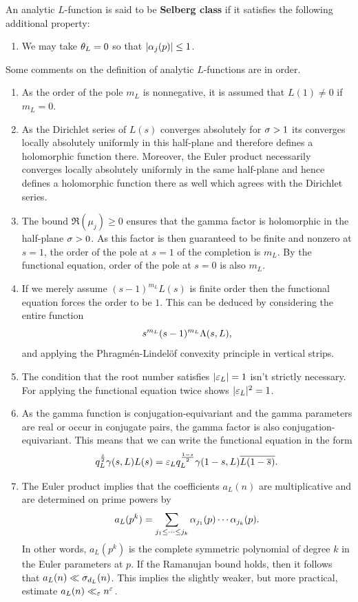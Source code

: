     An analytic \(L\)-function is said to be \textbf{Selberg class} if it satisfies the following additional property:

    \begin{enumerate}[align=left]
      \item[\textbf{Ramanujan bound:}] We may take \(\theta_{L} = 0\) so that \(|\alpha_{j}(p)| \le 1\).
    \end{enumerate}

    Some comments on the definition of analytic \(L\)-functions are in order.
    \begin{enumerate}[label*=(\roman*)]
      \item As the order of the pole \(m_{L}\) is nonnegative, it is assumed that \(L(1) \neq 0\) if \(m_{L} = 0\).
      \item As the Dirichlet series of \(L(s)\) converges absolutely for \(\sigma > 1\) its converges locally absolutely uniformly in this half-plane and therefore defines a holomorphic function there. Moreover, the Euler product necessarily converges locally absolutely uniformly in the same half-plane and hence defines a holomorphic function there as well which agrees with the Dirichlet series.
      \item The bound \(\Re(\mu_{j}) \ge 0\) ensures that the gamma factor is holomorphic in the half-plane \(\sigma > 0\). As this factor is then guaranteed to be finite and nonzero at \(s = 1\), the order of the pole at \(s = 1\) of the completion is \(m_{L}\). By the functional equation, order of the pole at \(s = 0\) is also \(m_{L}\).
      \item If we merely assume \((s-1)^{m_{L}}L(s)\) is finite order then the functional equation forces the order to be \(1\). This can be deduced by considering the entire function
      \[
        s^{m_{L}}(s-1)^{m_{L}}\Lambda(s,L),
      \]
      and applying the Phragm\'en-Lindel\"of convexity principle in vertical strips.
      \item The condition that the root number satisfies \(|\varepsilon_{L}| = 1\) isn't strictly necessary. For applying the functional equation twice shows \(|\varepsilon_{L}|^{2} = 1\).
      \item As the gamma function is conjugation-equivariant and the gamma parameters are real or occur in conjugate pairs, the gamma factor is also conjugation-equivariant. This means that we can write the functional equation in the form
      \[
        q_{L}^{\frac{s}{2}}\gamma(s,L)L(s) = \varepsilon_{L}q_{L}^{\frac{1-s}{2}}\gamma(1-s,L)\overline{L(1-\overline{s})}.
      \]
      \item The Euler product implies that the coefficients \(a_{L}(n)\) are multiplicative and are determined on prime powers by
      \[
        a_{L}(p^{k}) = \sum_{j_{1} \le \cdots \le j_{k}}\alpha_{j_{1}}(p) \cdots \alpha_{j_{k}}(p).
      \]
      In other words, \(a_{L}(p^{k})\) is the complete symmetric polynomial of degree \(k\) in the Euler parameters at \(p\). If the Ramanujan bound holds, then it follows that \(a_{L}(n) \ll \sigma_{d_{L}}(n)\). This implies the slightly weaker, but more practical, estimate \(a_{L}(n) \ll_{\varepsilon} n^{\varepsilon}\).
    \end{enumerate}

